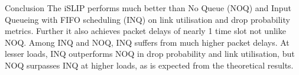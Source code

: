 \begin{section}{Conclusion}
    The iSLIP performs much better than No Queue (NOQ) and Input Queueing with FIFO scheduling (INQ) on link utilisation and drop probability metrics. Further it also achieves packet delays of nearly 1 time slot not unlike NOQ. Among INQ and NOQ, INQ suffers from much higher packet delays. At lesser loads, INQ outperforms NOQ in drop probability and link utilisation, but NOQ surpasses INQ at higher loads, as is expected from the theoretical results.  
\end{section}
